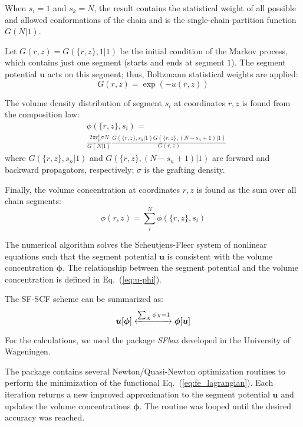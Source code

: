 \documentclass[10pt, a4paper, twocolumn]{article}
\begin{document}
When $s_i=1$ and $s_k=N$, the result contains the statistical weight of all possible and allowed conformations of the chain and is the single-chain partition function $G(N|1)$.

Let $G(r, z) = G(\{r, z\}, 1|1)$ be the initial condition of the Markov process, which contains just one segment (starts and ends at segment $1$).
The segment potential $\bm{u}$ acts on this segment; thus, Boltzmann statistical weights are applied:
\begin{equation}
    G(r, z) = \exp(-u(r,z))
\end{equation}

The volume density distribution of segment $s_i$ at coordinates $r, z$ is found from the composition law:
\begin{equation}
    \label{eq:propagation}
    \begin{aligned}
        &\phi(\{r, z\}, s_i) = \\
        &\frac{2 \pi r_{\text{p}}^{0} \sigma N}{G(N|1)}
        \frac{G(\{r, z\}, s_n | 1) G(\{r, z\}, (N - s_n + 1) | 1)}{G(r, z)}
    \end{aligned}
\end{equation}
where $G(\{r, z\}, s_n | 1)$ and $G(\{r, z\}, (N - s_n + 1) | 1)$ are forward and backward propagators, respectively; $\sigma$ is the grafting density.

Finally, the volume concentration at coordinates $r, z$ is found as the sum over all chain segments:
\begin{equation}
    \phi(r, z) = \sum_{i}^{N} \phi(\{r, z\}, s_i)
\end{equation}

The numerical algorithm solves the Scheutjens-Fleer system of nonlinear equations such that the segment potential $\bm{u}$ is consistent with the volume concentration $\boldsymbol{\phi}$.
The relationship between the segment potential and the volume concentration is defined in Eq.~(\ref{eq:u-phi}).

The SF-SCF scheme can be summarized as:
\begin{equation}
    \boldsymbol{u}[\boldsymbol{\phi}] \xleftrightarrow[]{\sum_{X} \phi_X = 1} \boldsymbol{\phi}[\boldsymbol{u}]
\end{equation}

For the calculations, we used the package \emph{SFbox} developed in the University of Wageningen.

The package contains several Newton/Quasi-Newton optimization routines to perform the minimization of the functional Eq.~(\ref{eq:fe_lagrangian}).
Each iteration returns a new improved approximation to the segment potential $\bm{u}$ and updates the volume concentrations $\bm{\phi}$.
The routine was looped until the desired accuracy was reached.
\end{document}
